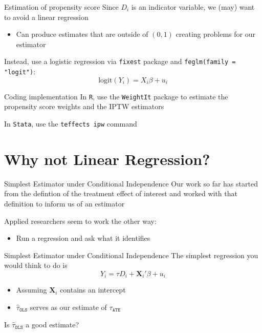 \documentclass[aspectratio=169,t,11pt,table]{beamer}
\begin{document}
\begin{frame}{Estimation of propensity score}
  Since $D_i$ is an indicator variable, we (may) want to avoid a linear regression
  \begin{itemize}
    \item Can produce estimates that are outside of $(0, 1)$ creating problems for our estimator
  \end{itemize}

  \pause
  \bigskip
  Instead, use a logistic regression via \texttt{fixest} package and \texttt{feglm(family = "logit")}:
  $$
    \text{logit}(Y_i) = X_i \beta + u_i
  $$
\end{frame}

\begin{frame}{Coding implementation}
  In \texttt{R}, use the \texttt{WeightIt} package to estimate the propensity score weights and the IPTW estimators

  \bigskip
  In \texttt{Stata}, use the \texttt{teffects ipw} command
\end{frame}



\section{Why not Linear Regression?}

\begin{frame}{Simplest Estimator under Conditional Independence}
  Our work so far has started from the defintion of the treatment effect of interest and worked with that definition to inform us of an estimator

  \bigskip
  Applied researchers seem to work the other way:
  \begin{itemize}
    \item Run a regression and ask what it identifies
  \end{itemize}
\end{frame}

\begin{frame}{Simplest Estimator under Conditional Independence}
  The simplest regression you would think to do is 
  $$
    Y_i = \tau D_i + \bm{X}_i' \beta + u_i
  $$
  \begin{itemize}
    \item Assuming $\bm{X}_i$ contains an intercept

    \item $\hat{\tau}_{\texttt{OLS}}$ serves as our estimate of $\tau_{\texttt{ATE}}$
  \end{itemize}

  \bigskip 
  Is $\hat{\tau}_{\texttt{OLS}}$ a good estimate?
\end{frame}
\end{document}
